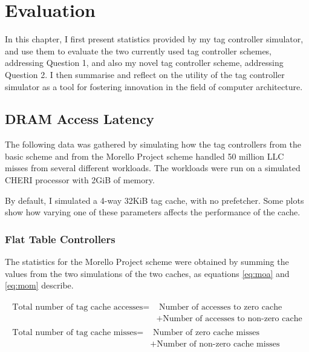 \chapter{Evaluation}

In this chapter, I first present statistics provided by my tag controller
simulator, and use them to evaluate the two currently used tag controller
schemes, addressing Question 1, and also my novel tag controller scheme,
addressing Question 2. I then summarise and reflect on the utility of the
tag controller simulator as a tool for fostering innovation in the field of
computer architecture.

\section{DRAM Access Latency}
The following data was gathered by simulating how the tag controllers from the
basic scheme and from the Morello Project scheme handled 50 million LLC misses
from several different workloads. The workloads were run on a simulated CHERI processor with 2GiB of memory.

By default, I simulated a 4-way 32KiB tag cache, with no prefetcher. Some plots show how varying one of these parameters affects the performance of the cache.

\subsection{Flat Table Controllers}
The statistics for the Morello Project scheme were obtained by summing the values from the two simulations of the two caches, as equations \ref{eq:moa} and \ref{eq:mom} describe.

\begin{align}
\begin{split}
	\label{eq:moa}
	\text{Total number of tag cache accesses} =& \text{ Number of accesses to zero cache} \\ &+ \text{Number of accesses to non-zero cache}
	\end{split}\\
	\begin{split}
	\label{eq:mom}
	\text{Total number of tag cache misses} =& \text{ Number of zero cache misses} \\ &+ \text{Number of non-zero cache misses}
	\end{split}
\end{align}

